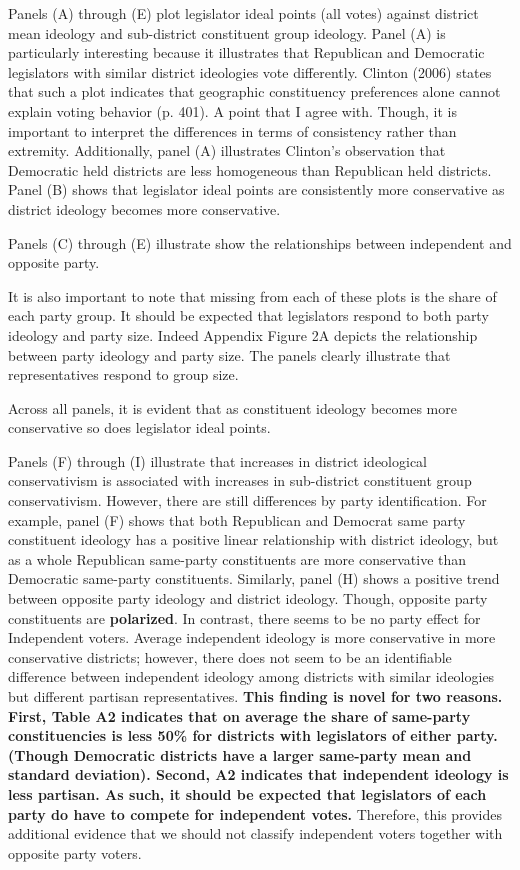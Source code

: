 \documentclass[10pt,letterpaper]{article}
\begin{document}
Panels (A) through (E) plot legislator ideal points (all votes) against district mean ideology and sub-district constituent group ideology. Panel (A) is particularly interesting because it illustrates that Republican and Democratic legislators with similar district ideologies vote differently. Clinton (2006) states that such a plot indicates that geographic constituency preferences alone cannot explain voting behavior (p. 401). A point that I agree with. Though, it is important to interpret the differences in terms of consistency rather than extremity. Additionally, panel (A) illustrates Clinton's observation that Democratic held districts are less homogeneous than Republican held districts. Panel (B) shows that legislator ideal points are consistently more conservative as district ideology becomes more conservative. 

Panels (C) through (E) illustrate show the relationships between independent and opposite party.

It is also important to note that missing from each of these plots is the share of each party group. It should be expected that legislators respond to both party ideology and party size. Indeed Appendix Figure 2A depicts the relationship between party ideology and party size. The panels clearly illustrate that representatives respond to group size.

Across all panels, it is evident that as constituent ideology becomes more conservative so does legislator ideal points.

Panels (F) through (I) illustrate that increases in district ideological conservativism is associated with increases in sub-district constituent group conservativism. However, there are still differences by party identification. For example, panel (F) shows that both Republican and Democrat same party constituent ideology has a positive linear relationship with district ideology, but as a whole Republican same-party constituents are more conservative than Democratic same-party constituents. Similarly, panel (H) shows a positive trend between opposite party ideology and district ideology. Though, opposite party constituents are \textbf{polarized}. In contrast, there seems to be no party effect for Independent voters. Average independent ideology is more conservative in more conservative districts; however, there does not seem to be an identifiable difference between independent ideology among districts with similar ideologies but different partisan representatives. \textbf{This finding is novel for two reasons. First, Table A2 indicates that on average the share of same-party constituencies is less 50\% for districts with legislators of either party. (Though Democratic districts have a larger same-party mean and standard deviation). Second, A2 indicates that independent ideology is less partisan. As such, it should be expected that legislators of each party do have to compete for independent votes.} Therefore, this provides additional evidence that we should not classify independent voters together with opposite party voters.
\end{document}
